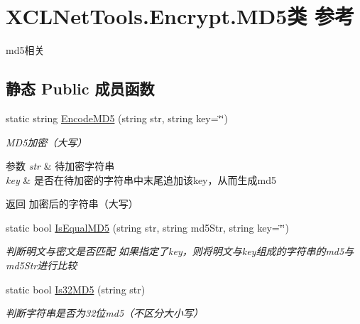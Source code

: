 \hypertarget{class_x_c_l_net_tools_1_1_encrypt_1_1_m_d5}{}\section{X\+C\+L\+Net\+Tools.\+Encrypt.\+M\+D5类 参考}
\label{class_x_c_l_net_tools_1_1_encrypt_1_1_m_d5}


md5相关  


\subsection*{静态 Public 成员函数}
\begin{DoxyCompactItemize}
\item 
static string \hyperlink{class_x_c_l_net_tools_1_1_encrypt_1_1_m_d5_a146cf118c47e0693f82119d39f4b7ef1}{Encode\+M\+D5} (string str, string key=\char`\"{}\char`\"{})
\begin{DoxyCompactList}\small\item\em M\+D5加密（大写） 
\begin{DoxyParams}{参数}
{\em str} & 待加密字符串\\
\hline
{\em key} & 是否在待加密的字符串中末尾追加该key，从而生成md5\\
\hline
\end{DoxyParams}
\begin{DoxyReturn}{返回}
加密后的字符串（大写）
\end{DoxyReturn}
\end{DoxyCompactList}\item 
static bool \hyperlink{class_x_c_l_net_tools_1_1_encrypt_1_1_m_d5_a47f3bda0226d74bd2c9823a023ed8ed5}{Is\+Equal\+M\+D5} (string str, string md5\+Str, string key=\char`\"{}\char`\"{})
\begin{DoxyCompactList}\small\item\em 判断明文与密文是否匹配 如果指定了key，则将明文与key组成的字符串的md5与md5\+Str进行比较 \end{DoxyCompactList}\item 
static bool \hyperlink{class_x_c_l_net_tools_1_1_encrypt_1_1_m_d5_aba314355a053d4f32af7b5c2a9e48773}{Is32\+M\+D5} (string str)
\begin{DoxyCompactList}\small\item\em 判断字符串是否为32位md5（不区分大小写） \end{DoxyCompactList}\end{DoxyCompactItemize}


